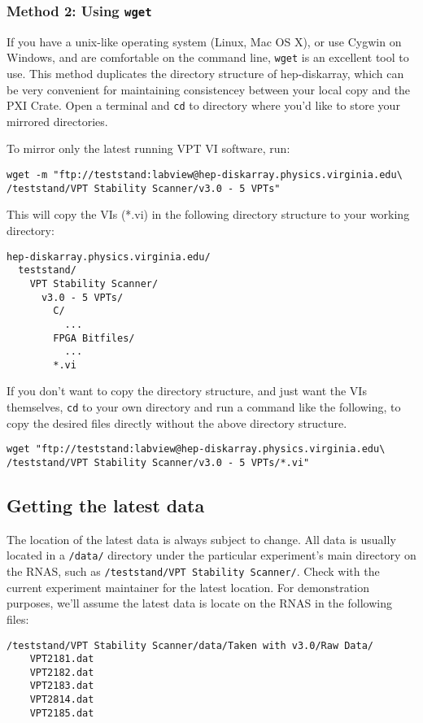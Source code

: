 \subsubsection{Method 2: Using \texttt{wget}}
\label{sec:op_start:vptvi:wget}

If you have a unix-like operating system (Linux, Mac OS X), or use Cygwin on Windows, and are comfortable on the command line, \texttt{wget} is an excellent tool to use.  This method duplicates the directory structure of hep-diskarray, which can be very convenient for maintaining consistencey between your local copy and the \gls{PXI Crate}.  Open a terminal and \texttt{cd} to directory where you'd like to store your mirrored directories.

To mirror only the latest running \gls{VPT VI} software, run:
\begin{verbatim}
wget -m "ftp://teststand:labview@hep-diskarray.physics.virginia.edu\
/teststand/VPT Stability Scanner/v3.0 - 5 VPTs"
\end{verbatim}

This will copy the VIs (*.vi) in the following directory structure to your working directory:
\begin{verbatim}
hep-diskarray.physics.virginia.edu/
  teststand/
    VPT Stability Scanner/
      v3.0 - 5 VPTs/
        C/
          ...
        FPGA Bitfiles/
          ...
        *.vi
\end{verbatim}

If you don't want to copy the directory structure, and just want the VIs themselves, \texttt{cd} to your own directory and run a command like the following, to copy the desired files directly without the above directory structure.
\begin{verbatim}
wget "ftp://teststand:labview@hep-diskarray.physics.virginia.edu\
/teststand/VPT Stability Scanner/v3.0 - 5 VPTs/*.vi"
\end{verbatim}

\subsection{Getting the latest data}
\label{sec:op_start:data}

The location of the latest data is always subject to change.  All data is usually located in a \texttt{/data/} directory under the particular experiment's main directory on the RNAS, such as \texttt{/teststand/VPT Stability Scanner/}.  Check with the current experiment maintainer for the latest location.  For demonstration purposes, we'll assume the latest data is locate on the RNAS in the following files:\\
\begin{verbatim}
/teststand/VPT Stability Scanner/data/Taken with v3.0/Raw Data/
    VPT2181.dat
    VPT2182.dat
    VPT2183.dat
    VPT2814.dat
    VPT2185.dat
\end{verbatim}



